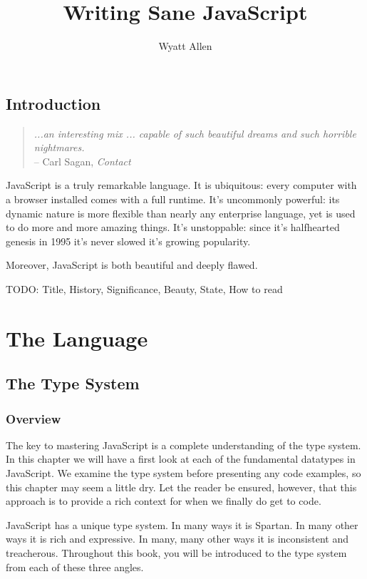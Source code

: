 \documentclass[11pt,letter]{book}
\begin{document}
    \title{Writing Sane JavaScript}
    \author{Wyatt Allen}
    \maketitle
    
    \chapter{Introduction}
    \begin{quote}
        \emph{
            ...an interesting mix ... capable of such beautiful dreams and such horrible nightmares.
        } \\
        -- Carl Sagan, \emph{Contact}
    \end{quote}
    
    JavaScript is a truly remarkable language. It is ubiquitous: every computer with a browser 
    installed comes with a full runtime. It's uncommonly powerful: its dynamic nature is more 
    flexible than nearly any enterprise language, yet is used to do more and more amazing things.
    It's unstoppable: since it's halfhearted genesis in 1995 it's never slowed it's growing 
    popularity.
    
    Moreover, JavaScript is both beautiful and deeply flawed.
    
    TODO: Title, History, Significance, Beauty, State, How to read
    
    \part{The Language}
    \chapter{The Type System}
    \section{Overview}
    The key to mastering JavaScript is a complete understanding of the type system. In this chapter
    we will have a first look at each of the fundamental datatypes in JavaScript. We examine the 
    type system before presenting any code examples, so this chapter may seem a little dry. Let the 
    reader be ensured, however, that this approach is to provide a rich context for when we finally
    do get to code.
    
    JavaScript has a unique type system. In many ways it is Spartan. In many other ways 
    it is rich and expressive. In many, many other ways it is inconsistent and treacherous.
    Throughout this book, you will be introduced to the type system from each of these three 
    angles.
    
\end{document}
